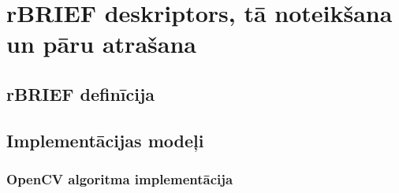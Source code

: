 \section{rBRIEF deskriptors, tā noteikšana un pāru atrašana} \label{sec:rbrief}
\subsection{rBRIEF definīcija} \label{sec:rbrief-def}
\TODO

\subsection{Implementācijas modeļi}
\subsubsection{OpenCV algoritma implementācija} \label{sec:rbrief-ocv}
\TODO
